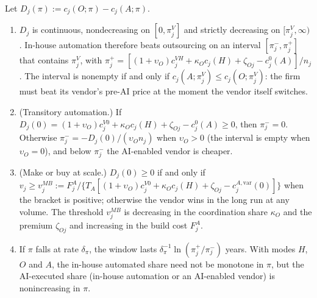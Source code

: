 \begin{proposition}\label{prop:tasks-window}
Let $D_j(\pi):=c_j(O;\pi)-c_j(A;\pi)$.
\begin{enumerate}
\item[(a)] $D_j$ is continuous, nondecreasing on $[0,\pi^V_j]$ and strictly decreasing on $[\pi^V_j,\infty)$. In-house automation therefore beats outsourcing on an interval $[\pi^-_j,\pi^+_j]$ that contains $\pi^V_j$, with $\pi^+_j=[(1+\upsilon_O)c^{VH}_j+\kappa_Oc_j(H)+\zeta_{Oj}-c^0_j(A)]/n_j$. The interval is nonempty if and only if $c_j(A;\pi^V_j)\le c_j(O;\pi^V_j)$: the firm must beat its vendor's pre-AI price at the moment the vendor itself switches.
\item[(b)] (Transitory automation.) If $D_j(0)=(1+\upsilon_O)c^{V0}_j+\kappa_Oc_j(H)+\zeta_{Oj}-c^0_j(A)\ge 0$, then $\pi^-_j=0$. Otherwise $\pi^-_j=-D_j(0)/(\upsilon_On_j)$ when $\upsilon_O>0$ (the interval is empty when $\upsilon_O=0$), and below $\pi^-_j$ the AI-enabled vendor is cheaper.
\item[(c)] (Make or buy at scale.) $D_j(0)\ge 0$ if and only if $v_j\ge v^{MB}_j:=F^A_j/\{T_A[(1+\upsilon_O)c^{V0}_j+\kappa_Oc_j(H)+\zeta_{Oj}-c^{A,\mathrm{var}}_j(0)]\}$ when the bracket is positive; otherwise the vendor wins in the long run at any volume. The threshold $v^{MB}_j$ is decreasing in the coordination share $\kappa_O$ and the premium $\zeta_{Oj}$ and increasing in the build cost $F^A_j$.
\item[(d)] If $\pi$ falls at rate $\delta_\pi$, the window lasts $\delta_\pi^{-1}\ln(\pi^+_j/\pi^-_j)$ years. With modes $H$, $O$ and $A$, the in-house automated share need not be monotone in $\pi$, but the AI-executed share (in-house automation or an AI-enabled vendor) is nonincreasing in $\pi$.
\end{enumerate}
\end{proposition}

